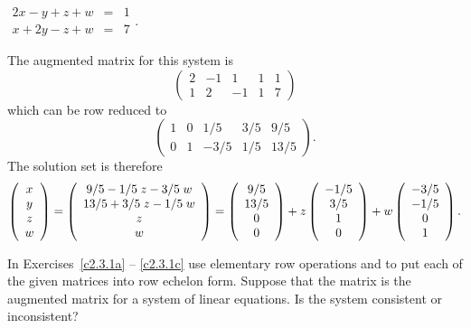 \documentclass{ximera}
\begin{document}
\begin{exercise} \label{c2.3.10b}
$\begin{array}{rcl}
2x-y+z+w & = & 1\\
   x+2y-z+w & = & 7 \end{array}$.


\begin{solution}
\soln The augmented matrix for this system is
\[
\left(\begin{array}{rrrr|r} 2 & -1 & 1 & 1 & 1 \\ 1 & 2 & -1 & 1 & 7
\end{array}\right)
\]
which can be row reduced to
\[
\left(\begin{array}{rrrr|r} 1 & 0 & 1/5 & 3/5 &
9/5 \\ 0 & 1 & -3/5 & 1/5 & 13/5
\end{array}\right).
\]
The solution set is therefore
\[
\left(\begin{array}{c} x \\ y \\ z \\ w \end{array}\right) =
\left(\begin{array}{c} 9/5 - 1/5\; z - 3/5\; w
\\ 13/5 + 3/5\; z - 1/5 \; w \\ z \\ w \end{array}\right)=
\left(\begin{array}{cccccccccccc} 9/5 \\ 13/5 \\ 0 \\ 0 \end{array}\right) + z\left(\begin{array}{cccccccccccc} -1/5\\  3/5 \\ 1 \\ 0 \end{array}\right) + w\left(\begin{array}{cccccccccccc} -3/5 \\ -1/5 \\ 0 \\ 1 \end{array}\right).
\]

\end{solution}
\end{exercise}




\matlabproblemlabel

\noindent In Exercises~\ref{c2.3.1a} -- \ref{c2.3.1c} use elementary row
operations and \Matlab to put each of the given matrices into row echelon
form.  Suppose that the matrix is the augmented matrix for a system of
linear equations.  Is the system consistent or inconsistent?
\end{document}
